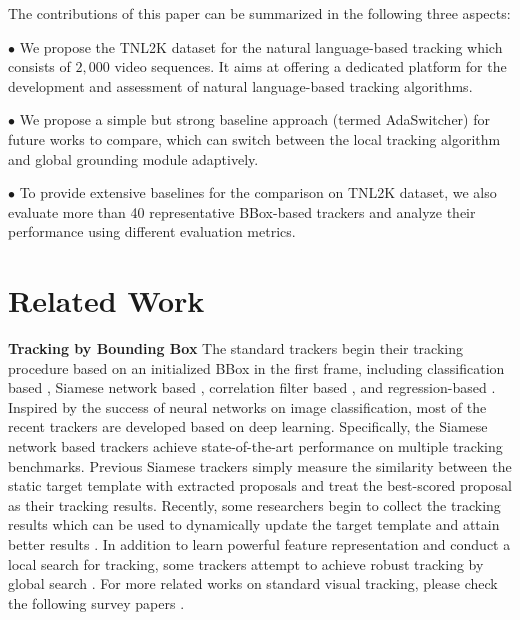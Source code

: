 \documentclass[final]{cvpr}
\begin{document}
 

The contributions of this paper can be summarized in the following three aspects: 

$\bullet$ We propose the TNL2K dataset for the natural language-based tracking which consists of $2,000$ video sequences. It aims at offering a dedicated platform for the development and assessment of natural language-based tracking algorithms. 

$\bullet$  We propose a simple but strong baseline approach (termed AdaSwitcher) for future works to compare, which can switch between the local tracking algorithm and global grounding module adaptively.  

$\bullet$  To provide extensive baselines for the comparison on TNL2K dataset, we also evaluate more than 40 representative BBox-based trackers and analyze their performance using different evaluation metrics. 















\section{Related Work} 

\textbf{Tracking by Bounding Box }
The standard trackers begin their tracking procedure based on an initialized BBox in the first frame, including classification based \cite{Nam2015Learning, Jung_2018_ECCV, Park_2018_ECCV, han2017branchout}, Siamese network based \cite{Wang_2018_CVPR, li2018siamrpn++, xu2020siamfc++, danelljan2019atom, danelljan2020PRDiMP}, correlation filter based \cite{lukezic2017discriminative, Danelljan2016Beyond, Henriques2015High, Danelljan2015Learning}, and regression-based \cite{held2016GOTURN}. Inspired by the success of neural networks on image classification, most of the recent trackers are developed based on deep learning. Specifically, the Siamese network based trackers achieve state-of-the-art performance on multiple tracking benchmarks. Previous Siamese trackers simply measure the similarity between the static target template with extracted proposals and treat the best-scored proposal as their tracking results. Recently, some researchers begin to collect the tracking results which can be used to dynamically update the target template and attain better results \cite{Yang_2018_ECCV, zhang2019UpdateNet}. In addition to learn powerful feature representation and conduct a local search for tracking, some trackers attempt to achieve robust tracking by global search \cite{Goutam2020KYS, voigtlaender2020siamRCNN, yan2019skimming, wang2019GANTrack, huang2019globaltrack, deepMTA}.  For more related works on standard visual tracking, please check the following survey papers \cite{li2013survey, Smeulders2014Visual, Yilmaz2006Object, marvasti2019TrackSurvey, li2018TrackSurvey}.  
\end{document}
